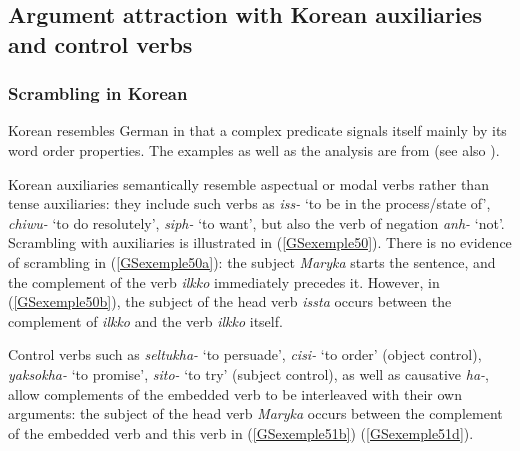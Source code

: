\documentclass[output=paper
                ,modfonts
                ,nonflat
	        ,collection
	        ,collectionchapter
	        ,collectiontoclongg
 	        ,biblatex
                ,babelshorthands
                ,newtxmath
                ,draftmode
                ,colorlinks, citecolor=brown
]{./langsci/langscibook}
\begin{document}
{\subsection{Argument attraction with Korean auxiliaries and control verbs}\label{GSsection4.2}

\subsubsection{Scrambling in Korean}\label{GSsection4.2.1}
 
Korean resembles German in that a complex predicate signals itself mainly by its word order properties. The examples as well as the analysis are from \cite{Chung98a-u} (see also \citealt{Sells1991, Yoo2003, Kim2016a-u}).

Korean auxiliaries semantically resemble aspectual or modal verbs rather than tense auxiliaries: they include such verbs as \emph{iss-} `to be in the process/state of', \emph{chiwu-} `to do resolutely’, \emph{siph-} `to want', but also the verb of negation \emph{anh-} `not'. Scrambling with auxiliaries is illustrated in (\ref{GSexemple50}). There is no evidence of scrambling in (\ref{GSexemple50a}): the subject \emph{Maryka} starts the sentence, and the complement of the verb \emph{ilkko} immediately precedes it. However, in (\ref{GSexemple50b}), the subject of the head verb \emph{issta} occurs between the complement of \emph{ilkko} and the verb \emph{ilkko} itself. 

\eal
	\label{GSexemple50} 
    \label{GSexemple50a}

    \label{GSexemple50b}
\zl

Control verbs such as \emph{seltukha-} `to persuade’, \emph{cisi-} `to order' (object control), \emph{yaksokha-} `to promise',  \emph{sito-} `to try' (subject control), as well as causative \emph{ha-}, allow complements of the embedded verb to be interleaved with their own arguments: the subject of the head verb \emph{Maryka} occurs between the complement of the embedded verb and this verb in (\ref{GSexemple51b}) (\ref{GSexemple51d}).  

}
\end{document}
